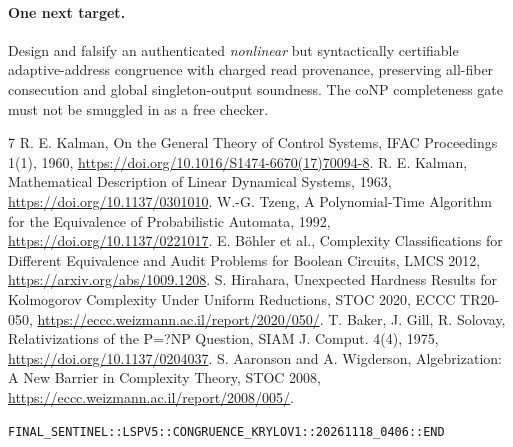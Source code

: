 \documentclass[11pt]{article}
\begin{document}
\paragraph{One next target.} Design and falsify an authenticated \emph{nonlinear} but syntactically certifiable adaptive-address congruence with charged read provenance, preserving all-fiber consecution and global singleton-output soundness. The coNP completeness gate must not be smuggled in as a free checker.
\begin{thebibliography}{7}
 R. E. Kalman, On the General Theory of Control Systems, IFAC Proceedings 1(1), 1960, \url{https://doi.org/10.1016/S1474-6670(17)70094-8}.
 R. E. Kalman, Mathematical Description of Linear Dynamical Systems, 1963, \url{https://doi.org/10.1137/0301010}.
 W.-G. Tzeng, A Polynomial-Time Algorithm for the Equivalence of Probabilistic Automata, 1992, \url{https://doi.org/10.1137/0221017}.
 E. B\"ohler et al., Complexity Classifications for Different Equivalence and Audit Problems for Boolean Circuits, LMCS 2012, \url{https://arxiv.org/abs/1009.1208}.
 S. Hirahara, Unexpected Hardness Results for Kolmogorov Complexity Under Uniform Reductions, STOC 2020, ECCC TR20-050, \url{https://eccc.weizmann.ac.il/report/2020/050/}.
 T. Baker, J. Gill, R. Solovay, Relativizations of the P=?NP Question, SIAM J. Comput. 4(4), 1975, \url{https://doi.org/10.1137/0204037}.
 S. Aaronson and A. Wigderson, Algebrization: A New Barrier in Complexity Theory, STOC 2008, \url{https://eccc.weizmann.ac.il/report/2008/005/}.
\end{thebibliography}
\noindent\texttt{FINAL\_SENTINEL::LSPV5::CONGRUENCE\_KRYLOV1::20261118\_0406::END}
\end{document}
